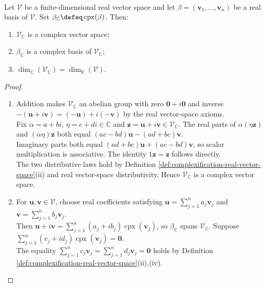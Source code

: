 \begin{proposition} \label{prop:complexification-vector-space-basis} \\
Let $\mathcal{V}$ be a finite-dimensional real vector space and let $\beta=(\mathbf{v}_1,\ldots,\mathbf{v}_n)$ be a real basis of $\mathcal{V}$. Set $\beta_{\mathbb{C}}\defeq\operatorname{cpx}(\beta)$. Then:
\begin{enumerate}[label=(\roman*)]
\setlength{\itemsep}{0pt}
\item $\mathcal{V}_{\mathbb{C}}$ is a complex vector space;
\item $\beta_{\mathbb{C}}$ is a complex basis of $\mathcal{V}_{\mathbb{C}}$;
\item $\dim_{\mathbb{C}}(\mathcal{V}_{\mathbb{C}})=\dim_{\mathbb{R}}(\mathcal{V})$.
\end{enumerate}
\begin{proof}
\begin{enumerate}[label=(\roman*)]
\setlength{\itemsep}{0pt}
\item Addition makes $\mathcal{V}_{\mathbb{C}}$ an abelian group with zero $\mathbf{0}+i\mathbf{0}$ and inverse $-(\mathbf{u}+i\mathbf{v})=(-\mathbf{u})+i(-\mathbf{v})$ by the real vector-space axioms.\\
Fix $\alpha=a+bi$, $\eta=c+di\in\mathbb{C}$ and $\mathbf{z}=\mathbf{u}+i\mathbf{v}\in\mathcal{V}_{\mathbb{C}}$. The real parts of $\alpha(\eta\mathbf{z})$ and $(\alpha\eta)\mathbf{z}$ both equal $(ac-bd)\mathbf{u}-(ad+bc)\mathbf{v}$.\\
Imaginary parts both equal $(ad+bc)\mathbf{u}+(ac-bd)\mathbf{v}$, so scalar multiplication is associative. The identity $1\mathbf{z}=\mathbf{z}$ follows directly.\\
The two distributive laws hold by Definition \ref{def:complexification-real-vector-space}(ii) and real vector-space distributivity. Hence $\mathcal{V}_{\mathbb{C}}$ is a complex vector space.
\item For $\mathbf{u},\mathbf{v}\in\mathcal{V}$, choose real coefficients satisfying $\mathbf{u}=\sum\limits_{j=1}^{n}a_j\mathbf{v}_j$ and $\mathbf{v}=\sum\limits_{j=1}^{n}b_j\mathbf{v}_j$.\\
Then $\mathbf{u}+i\mathbf{v}=\sum\limits_{j=1}^{n}(a_j+ib_j)\operatorname{cpx}(\mathbf{v}_j)$, so $\beta_{\mathbb{C}}$ spans $\mathcal{V}_{\mathbb{C}}$. Suppose $\sum\limits_{j=1}^{n}(c_j+id_j)\operatorname{cpx}(\mathbf{v}_j)=\mathbf{0}$.\\
The equality $\sum\limits_{j=1}^{n}c_j\mathbf{v}_j=\sum\limits_{j=1}^{n}d_j\mathbf{v}_j=\mathbf{0}$ holds by Definition \ref{def:complexification-real-vector-space}(ii),(iv).\\

\end{enumerate}
\end{proof}
\end{proposition}
